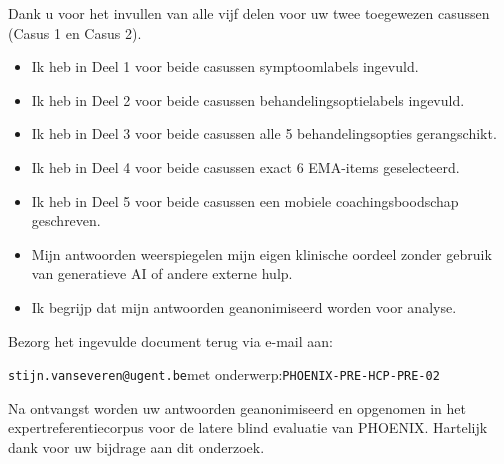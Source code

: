 \documentclass[11pt,a4paper]{article}
\begin{document}
Dank u voor het invullen van alle vijf delen voor uw twee toegewezen casussen
(Casus 1 en Casus 2).

\begin{instrbox}[title=Checklist voor terugbezorging]
\begin{itemize}
\item[$\square$] Ik heb in Deel 1 voor beide casussen symptoomlabels ingevuld.
\item[$\square$] Ik heb in Deel 2 voor beide casussen behandelingsoptielabels ingevuld.
\item[$\square$] Ik heb in Deel 3 voor beide casussen alle 5 behandelingsopties gerangschikt.
\item[$\square$] Ik heb in Deel 4 voor beide casussen exact 6 EMA-items geselecteerd.
\item[$\square$] Ik heb in Deel 5 voor beide casussen een mobiele coachingsboodschap geschreven.
\item[$\square$] Mijn antwoorden weerspiegelen mijn eigen klinische oordeel zonder gebruik van generatieve AI of andere externe hulp.
\item[$\square$] Ik begrijp dat mijn antwoorden geanonimiseerd worden voor analyse.
\end{itemize}
\end{instrbox}

\medskip
Bezorg het ingevulde document terug via e-mail aan:
\begin{center}
\texttt{stijn.vanseveren@ugent.be}\quad met onderwerp:\quad \texttt{PHOENIX-PRE-HCP-PRE-02}
\end{center}

\vspace{0.5em}
\begin{tcolorbox}[colback=AccentBlue,colframe=PrimaryBlue,arc=2mm,boxrule=0.6pt,left=8pt,right=8pt,top=7pt,bottom=7pt]
\small\centering
Na ontvangst worden uw antwoorden geanonimiseerd en opgenomen in het expertreferentiecorpus
voor de latere blind evaluatie van PHOENIX. Hartelijk dank voor uw bijdrage aan dit onderzoek.
\end{tcolorbox}
\end{document}
